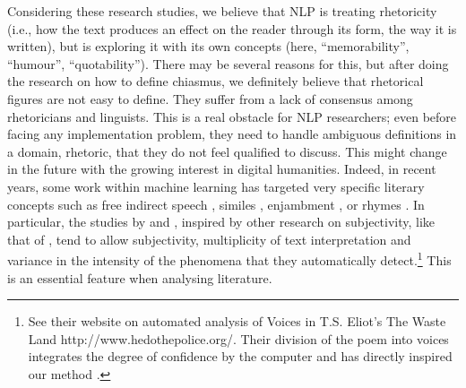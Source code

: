 Considering these research studies, we believe that NLP is treating rhetoricity (i.e., how the text produces an effect on the reader through its form, the way it is written), but is exploring it with its own concepts (here, ``memorability'', ``humour'', ``quotability''). There may be several reasons for this, but after doing the research on how to define chiasmus, we definitely believe that rhetorical figures are not easy to define. They suffer from a lack of consensus among rhetoricians and linguists. This is a real obstacle for NLP researchers; even before facing any implementation problem, they need to handle ambiguous definitions in a domain, rhetoric, that they do not feel qualified to discuss. %
This might change in the future with the growing interest in digital humanities. Indeed, in recent years, some work within machine learning has targeted very specific literary concepts such as free indirect speech \citep{hammond2013}, similes \citep{niculae2013}, enjambment \citep{ruiz2017}, or rhymes \citep{Mccurdy2015}. In particular, the studies by \citet{hammond2013} and \citet{Brooke2015}, inspired by other research on subjectivity, like that of \citet{Morris2004}, tend to allow subjectivity, multiplicity of text interpretation and variance in the intensity of the phenomena that they automatically detect.\footnote{See their website on automated analysis of Voices in T.S. Eliot's The Waste Land http://www.hedothepolice.org/. Their division of the poem into voices integrates the degree of confidence by the computer and has directly inspired our method \citep{hammond2013}.} This is an essential feature when analysing literature. %

